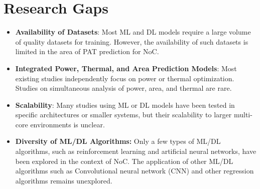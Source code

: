 \documentclass[conference]{IEEEtran}
\begin{document}
\clearpage %

\section{Research Gaps}
\begin{itemize}
    \item \textbf{Availability of Datasets}: Most ML and DL models require a large volume of quality datasets for training. However, the availability of such datasets is limited in the area of PAT prediction for NoC.
  
    \item \textbf{Integrated Power, Thermal, and Area Prediction Models}: Most existing studies independently focus on power or thermal optimization. Studies on simultaneous analysis of power, area, and thermal are rare.
  
    \item \textbf{Scalability}: Many studies using ML or DL models have been tested in specific architectures or smaller systems, but their scalability to larger multi-core environments is unclear.

    \item \textbf{Diversity of ML/DL Algorithms:} Only a few types of ML/DL algorithms, such as reinforcement learning and artificial neural networks, have been explored in the context of NoC. The application of other ML/DL algorithms such as Convolutional neural network (CNN) and other regression algorithms remains unexplored.
\end{itemize}
\end{document}
